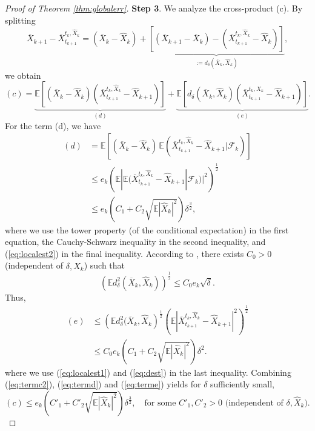 \documentclass[letterpaper,10pt,reqno]{amsart}
\def\eqref#1{(\ref{#1})}
\numberwithin{equation}{section}
\begin{document}
\begin{proof}[Proof of Theorem \ref{thm:globalerr}]
{\bf Step 3}. We analyze the cross-product (c). 
By splitting
\begin{equation*}
\overline{X}_{k+1} - \overline{X}_{t_{k+1}}^{t_k, \widehat{X}_k}
= (\overline{X}_k - \widehat{X}_k) + \underbrace{\left[ (\overline{X}_{k+1} - \overline{X}_k) - (\overline{X}_{t_{k+1}}^{t_k, \widehat{X}_k} - \widehat{X}_k)\right]}_{:= d_\delta(\overline{X}_k, \widehat{X}_k)},
\end{equation*}
we obtain
\begin{equation}
\label{eq:termc2}
(c) = \underbrace{\mathbb{E}\left[(\overline{X}_k - \widehat{X}_k) (\overline{X}_{t_{k+1}}^{t_k, \widehat{X}_{k}}- \widehat{X}_{k+1})\right]}_{(d)} + \underbrace{\mathbb{E}\left[d_\delta(\overline{X}_k, \widehat{X}_k) (\overline{X}_{t_{k+1}}^{t_k, \widehat{X}_{k}}- \widehat{X}_{k+1})\right]}_{(e)}.
\end{equation}
For the term (d), we have
\begin{equation}
\label{eq:termd}
\begin{aligned}
(d)& = \mathbb{E}\left[(\overline{X}_k - \widehat{X}_k) \, \mathbb{E}(\overline{X}_{t_{k+1}}^{t_k, \widehat{X}_{k}}- \widehat{X}_{k+1}| \mathcal{F}_k)\right] \\
& \le e_k \left(\mathbb{E}|\mathbb{E}(\overline{X}_{t_{k+1}}^{t_k, \widehat{X}_{k}}- \widehat{X}_{k+1}| \mathcal{F}_k)|^2 \right)^{\frac{1}{2}} \\
& \le e_k \left(C_1 + C_2 \sqrt{\mathbb{E}|\widehat{X}_k|^2} \right) \delta^{\frac{3}{2}},
\end{aligned}
\end{equation}
where we use the tower property (of the conditional expectation) in the first equation, the Cauchy-Schwarz inequality in the second inequality, and \eqref{eq:localest2} in the final inequality. 
According to \cite[Lemma 1.3]{MT04}, there exists $C_0 > 0$ (independent of $\delta, \widehat{X}_k$) such that
\begin{equation}
\label{eq:dest}
\left(\mathbb{E}d^2_\delta(\overline{X}_k, \widehat{X}_k)\right)^{\frac{1}{2}} \le C_0 e_k \sqrt{\delta}.
\end{equation}
Thus,
\begin{equation}
\label{eq:terme}
\begin{aligned}
(e) & \le \left( \mathbb{E} d^2_\delta(\overline{X}_k, \widehat{X}_k \right)^{\frac{1}{2}} \left( \mathbb{E}|\overline{X}_{t_{k+1}}^{t_k, \widehat{X}_{k}}- \widehat{X}_{k+1}|^2\right)^{\frac{1}{2}} \\
& \le C_0 e_k \left(C_1 + C_2 \sqrt{\mathbb{E}|\widehat{X}_k|^2} \right)\delta^2.
\end{aligned}
\end{equation}
where we use \eqref{eq:localest1} and \eqref{eq:dest} in the last inequality.
Combining \eqref{eq:termc2}, \eqref{eq:termd} and \eqref{eq:terme} yields
for $\delta$ sufficiently small,
\begin{equation}
\label{eq:termc}
(c) \le e_k \left(C'_1 + C'_2 \sqrt{\mathbb{E}|\widehat{X}_k|^2} \right) \delta^{\frac{3}{2}}, \quad \mbox{for some } C'_1, C'_2 > 0 \mbox{ (independent of } \delta, \widehat{X}_k).
\end{equation}


\end{proof}
\end{document}
